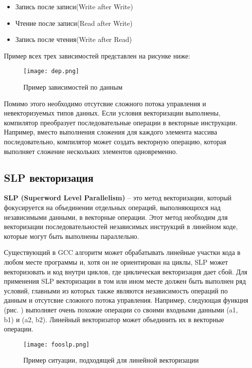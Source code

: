 \begin{itemize}
    \item Запись после записи(Write after Write)
    \item Чтение после записи(Read after Write)
    \item Запись после чтения(Write after Read)
\end{itemize}

Пример всех трех зависимостей представлен на рисунке ниже:

\begin{figure}[!htb]
    \centering
    \texttt{[image: dep.png]}
    \caption{Пример зависимостей по данным}
\end{figure}

Помимо этого необходимо отсутсвие сложного потока управления и невекторизуемых типов данных. Если условия векторизации выполнены, компилятор преобразует последовательные операции в векторные инструкции. Например, вместо выполнения сложения для каждого элемента массива последовательно, компилятор может создать векторную операцию, которая выполняет сложение нескольких элементов одновременно.

\subsection{SLP векторизация}

\textbf{SLP (Superword Level Parallelism)} – это метод векторизации, который фокусируется на объединении отдельных операций, выполняющихся над независимыми данными, в векторные операции. Этот метод необходим для векторизации последовательностей независимых инструкций в линейном коде, которые могут быть выполнены параллельно.

Существующий в GCC алгоритм может обрабатывать линейные участки кода в любом месте программы и, хотя он не ориентирован на циклы, SLP может векторизовать и код внутри циклов, где циклическая векторизация дает сбой. Для применения SLP векторизации в том или ином месте должен быть выполнен ряд условий, главными из которых также являются независимость операций по данным и отсутсвие сложного потока управления. Например, следующая функция (рис. \todo[номер]) выполняет очень похожие операции со своими входными данными (a1, b1) и (a2, b2). Линейный векторизатор может объединить их в векторные операции.

\begin{figure}[!htb]
    \centering
    \texttt{[image: fooslp.png]}
    \caption{Пример ситуации, подходящей для линейной векторизации}
\end{figure}

